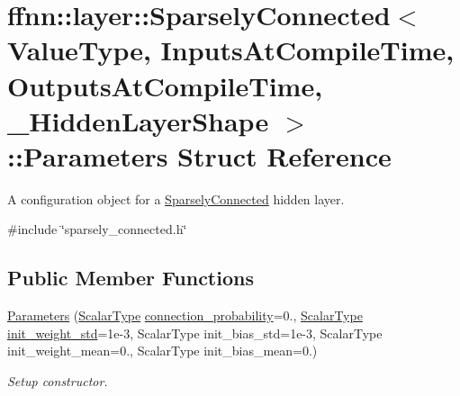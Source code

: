 \hypertarget{structffnn_1_1layer_1_1_sparsely_connected_1_1_parameters}{\section{ffnn\-:\-:layer\-:\-:Sparsely\-Connected$<$ Value\-Type, Inputs\-At\-Compile\-Time, Outputs\-At\-Compile\-Time, \-\_\-\-Hidden\-Layer\-Shape $>$\-:\-:Parameters Struct Reference}
\label{structffnn_1_1layer_1_1_sparsely_connected_1_1_parameters}
}


A configuration object for a \hyperlink{classffnn_1_1layer_1_1_sparsely_connected}{Sparsely\-Connected} hidden layer.  




{\ttfamily \#include \char`\"{}sparsely\-\_\-connected.\-h\char`\"{}}

\subsection*{Public Member Functions}
\begin{DoxyCompactItemize}
\item 
\hyperlink{structffnn_1_1layer_1_1_sparsely_connected_1_1_parameters_acf0d0c7c3a01f292c035994e0bdda75d}{Parameters} (\hyperlink{classffnn_1_1layer_1_1internal_1_1_interface_a7f834e3365e5199bcbcd16d9abd63941}{Scalar\-Type} \hyperlink{structffnn_1_1layer_1_1_sparsely_connected_1_1_parameters_a39f70b139f89889bd9922b0f1e3e1a08}{connection\-\_\-probability}=0., \hyperlink{classffnn_1_1layer_1_1internal_1_1_interface_a7f834e3365e5199bcbcd16d9abd63941}{Scalar\-Type} \hyperlink{structffnn_1_1layer_1_1_sparsely_connected_1_1_parameters_a53c73023fc8eed25b729108ecaa6b02a}{init\-\_\-weight\-\_\-std}=1e-\/3, Scalar\-Type init\-\_\-bias\-\_\-std=1e-\/3, Scalar\-Type init\-\_\-weight\-\_\-mean=0., Scalar\-Type init\-\_\-bias\-\_\-mean=0.)
\begin{DoxyCompactList}\small\item\em Setup constructor. \end{DoxyCompactList}\end{DoxyCompactItemize}

